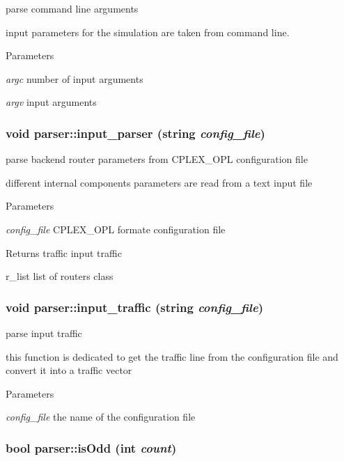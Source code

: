 parse command line arguments 

input parameters for the simulation are taken from command line. 
\begin{DoxyParams}{Parameters}
\item[{\em argc}]number of input arguments \item[{\em argv}]input arguments \end{DoxyParams}
\hypertarget{classparser_a4bcf9f11cfbb793a414221fafd4c4a7d}{
\subsubsection[{input\_\-parser}]{\setlength{\rightskip}{0pt plus 5cm}void parser::input\_\-parser (string {\em config\_\-file})}}
\label{classparser_a4bcf9f11cfbb793a414221fafd4c4a7d}


parse backend router parameters from CPLEX\_\-OPL configuration file 

different internal components parameters are read from a text input file 
\begin{DoxyParams}{Parameters}
\item[{\em config\_\-file}]CPLEX\_\-OPL formate configuration file \end{DoxyParams}
\begin{DoxyReturn}{Returns}
traffic input traffic 

r\_\-list list of routers class 
\end{DoxyReturn}
\hypertarget{classparser_a30a37d82f9894b3c725e2dd1daa0234f}{
\subsubsection[{input\_\-traffic}]{\setlength{\rightskip}{0pt plus 5cm}void parser::input\_\-traffic (string {\em config\_\-file})}}
\label{classparser_a30a37d82f9894b3c725e2dd1daa0234f}


parse input traffic 

this function is dedicated to get the traffic line from the configuration file and convert it into a traffic vector 
\begin{DoxyParams}{Parameters}
\item[{\em config\_\-file}]the name of the configuration file \end{DoxyParams}
\hypertarget{classparser_a8afa4de9b61d1d11a85de1c00041e69b}{
\subsubsection[{isOdd}]{\setlength{\rightskip}{0pt plus 5cm}bool parser::isOdd (int {\em count})}}
\label{classparser_a8afa4de9b61d1d11a85de1c00041e69b}


